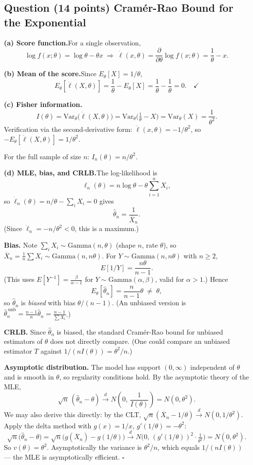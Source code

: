 \documentclass[11pt]{article}
\newcounter{qnum}
\newcommand{\question}[2]{\stepcounter{qnum}\subsection*{Question \theqnum \quad (#1 points) \hfill #2}}
\newcommand{\Var}{\mathrm{Var}}
\begin{document}
\question{14}{Cram\'er-Rao Bound for the Exponential}

\textbf{(a) Score function.}\quad For a single observation,
\[
\log f(x;\theta) = \log\theta - \theta x \;\Rightarrow\; \dot\ell(x,\theta) = \frac{\partial}{\partial\theta}\log f(x;\theta) = \frac{1}{\theta} - x.
\]

\medskip

\textbf{(b) Mean of the score.}\quad Since $E_\theta[X] = 1/\theta$,
\[
E_\theta[\dot\ell(X,\theta)] = \frac{1}{\theta} - E_\theta[X] = \frac{1}{\theta} - \frac{1}{\theta} = 0. \quad\checkmark
\]

\medskip

\textbf{(c) Fisher information.}\quad
\[
I(\theta) = \Var_\theta\!\bigl(\dot\ell(X,\theta)\bigr) = \Var_\theta\!\bigl(\tfrac{1}{\theta}-X\bigr) = \Var_\theta(X) = \frac{1}{\theta^2}.
\]
Verification via the second-derivative form: $\ddot\ell(x,\theta) = -1/\theta^2$, so $-E_\theta[\ddot\ell(X,\theta)] = 1/\theta^2$. \quad\checkmark

For the full sample of size $n$: $I_n(\theta) = n/\theta^2$.

\medskip

\textbf{(d) MLE, bias, and CRLB.}\quad The log-likelihood is
\[
\ell_n(\theta) = n\log\theta - \theta \sum_{i=1}^n X_i,
\]
so $\dot\ell_n(\theta) = n/\theta - \sum_i X_i = 0$ gives
\[
\boxed{\hat\theta_n = \frac{1}{\overline{X}_n}.}
\]
(Since $\ddot\ell_n = -n/\theta^2 < 0$, this is a maximum.)

\textbf{Bias.} Note $\sum_i X_i \sim \mathrm{Gamma}(n,\theta)$ (shape $n$, rate $\theta$), so $\overline{X}_n = \frac{1}{n}\sum X_i \sim \mathrm{Gamma}(n, n\theta)$. For $Y \sim \mathrm{Gamma}(n, n\theta)$ with $n \ge 2$,
\[
E[1/Y] = \frac{n\theta}{n-1}.
\]
(This uses $E[Y^{-1}] = \frac{\beta}{\alpha-1}$ for $Y \sim \mathrm{Gamma}(\alpha,\beta)$, valid for $\alpha > 1$.) Hence
\[
E_\theta[\hat\theta_n] = \frac{n}{n-1}\theta \;\neq\; \theta,
\]
so $\hat\theta_n$ is \emph{biased} with bias $\theta/(n-1)$. (An unbiased version is $\hat\theta_n^{\,\text{unb}} = \frac{n-1}{n}\hat\theta_n = \frac{n-1}{\sum X_i}$.)

\textbf{CRLB.} Since $\hat\theta_n$ is biased, the standard Cram\'er-Rao bound for unbiased estimators of $\theta$ does not directly compare. (One could compare an unbiased estimator $T$ against $1/(nI(\theta)) = \theta^2/n$.)

\textbf{Asymptotic distribution.} The model has support $(0,\infty)$ independent of $\theta$ and is smooth in $\theta$, so regularity conditions hold. By the asymptotic theory of the MLE,
\[
\sqrt{n}\,(\hat\theta_n - \theta) \xrightarrow{d} N\!\left(0,\,\frac{1}{I(\theta)}\right) = N(0,\theta^2).
\]
We may also derive this directly: by the CLT, $\sqrt{n}(\overline{X}_n - 1/\theta) \xrightarrow{d} N(0,1/\theta^2)$. Apply the delta method with $g(x) = 1/x$, $g'(1/\theta) = -\theta^2$:
\[
\sqrt{n}\bigl(\hat\theta_n - \theta\bigr) = \sqrt{n}\bigl(g(\overline{X}_n) - g(1/\theta)\bigr) \xrightarrow{d} N\!\bigl(0,\,(g'(1/\theta))^2 \cdot \tfrac{1}{\theta^2}\bigr) = N(0,\theta^2).
\]
So $v(\theta) = \theta^2$. Asymptotically the variance is $\theta^2/n$, which equals $1/(nI(\theta))$ --- the MLE is asymptotically efficient. \hfill$\square$
\end{document}

